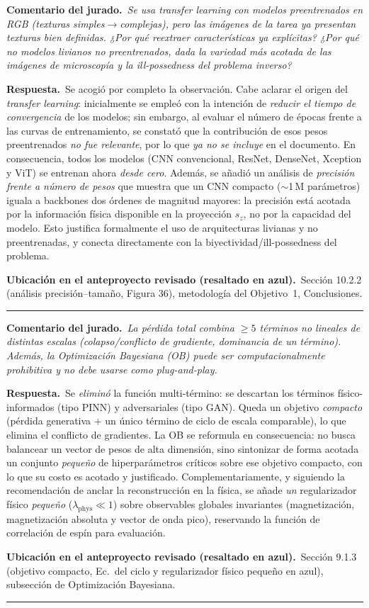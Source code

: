 \documentclass[11pt]{article}
\newcommand{\comentario}[1]{\par\smallskip\noindent\textbf{\color{jgris}Comentario del jurado.}\ \textit{#1}\par}
\newcommand{\respuesta}[1]{\par\smallskip\noindent\textbf{\color{jverde}Respuesta.}\ #1\par}
\newcommand{\ubic}[1]{\par\smallskip\noindent\textbf{\color{jazul}Ubicación en el anteproyecto revisado (resaltado en azul).}\ #1\par\medskip\hrule\medskip}
\begin{document}
\comentario{Se usa \emph{transfer learning} con modelos preentrenados en RGB (texturas simples$\to$complejas), pero las imágenes de la tarea ya presentan texturas bien definidas. ¿Por qué reextraer características ya explícitas? ¿Por qué no modelos livianos no preentrenados, dada la variedad más acotada de las imágenes de microscopía y la ill-possedness del problema inverso?}
\respuesta{Se acogió por completo la observación. Cabe aclarar el origen del \emph{transfer learning}: inicialmente se empleó con la intención de \emph{reducir el tiempo de convergencia} de los modelos; sin embargo, al evaluar el número de épocas frente a las curvas de entrenamiento, se constató que la contribución de esos pesos preentrenados \emph{no fue relevante}, por lo que \emph{ya no se incluye} en el documento. En consecuencia, todos los modelos (CNN convencional, ResNet, DenseNet, Xception y ViT) se entrenan ahora \emph{desde cero}. Además, se añadió un análisis de \emph{precisión frente a número de pesos} que muestra que un CNN compacto ($\sim$1\,M parámetros) iguala a backbones dos órdenes de magnitud mayores: la precisión está acotada por la información física disponible en la proyección $s_z$, no por la capacidad del modelo. Esto justifica formalmente el uso de arquitecturas livianas y no preentrenadas, y conecta directamente con la biyectividad/ill-possedness del problema.}
\ubic{Sección 10.2.2 (análisis precisión--tamaño, Figura 36), metodología del Objetivo~1, Conclusiones.}

\comentario{La pérdida total combina $\geq5$ términos no lineales de distintas escalas (colapso/conflicto de gradiente, dominancia de un término). Además, la Optimización Bayesiana (OB) puede ser computacionalmente prohibitiva y no debe usarse como \emph{plug-and-play}.}
\respuesta{Se \emph{eliminó} la función multi-término: se descartan los términos físico-informados (tipo PINN) y adversariales (tipo GAN). Queda un objetivo \emph{compacto} (pérdida generativa $+$ un único término de ciclo de escala comparable), lo que elimina el conflicto de gradientes. La OB se reformula en consecuencia: no busca balancear un vector de pesos de alta dimensión, sino sintonizar de forma acotada un conjunto \emph{pequeño} de hiperparámetros críticos sobre ese objetivo compacto, con lo que su costo es acotado y justificado. Complementariamente, y siguiendo la recomendación de anclar la reconstrucción en la física, se añade \emph{un} regularizador físico \emph{pequeño} ($\lambda_{\mathrm{phys}}\!\ll\!1$) sobre observables globales invariantes (magnetización, magnetización absoluta y vector de onda pico), reservando la función de correlación de espín para evaluación.}
\ubic{Sección 9.1.3 (objetivo compacto, Ec.\ del ciclo y regularizador físico pequeño en azul), subsección de Optimización Bayesiana.}
\end{document}
